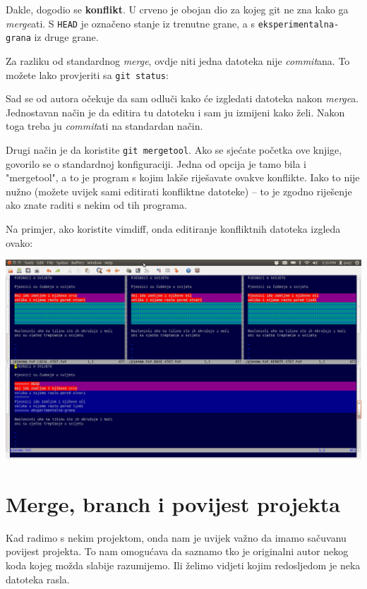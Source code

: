 Dakle, dogodio se \textbf{konflikt}. 
U crveno je obojan dio za kojeg git ne zna kako ga \emph{merge}ati.
S \verb+HEAD+ je označeno stanje iz trenutne grane, a s \verb+eksperimentalna-grana+ iz druge grane.

Za razliku od standardnog \emph{merge}, ovdje niti jedna datoteka nije \emph{commit}ana. 
To možete lako provjeriti sa \verb+git status+:



Sad se od autora očekuje da sam odluči kako će izgledati datoteka nakon \emph{merge}a.
Jednostavan način je da editira tu datoteku i sam ju izmijeni kako želi.
Nakon toga treba ju \emph{commit}ati na standardan način.

Drugi način je da koristite \verb+git mergetool+.
Ako se sjećate početka ove knjige, govorilo se o standardnoj konfiguraciji. 
Jedna od opcija je tamo bila i "mergetool", a to je program s kojim lakše riješavate ovakve konflikte.
Iako to nije nužno (možete uvijek sami editirati konfliktne datoteke) -- to je zgodno riješenje ako znate raditi s nekim od tih programa.

Na primjer, ako koristite vimdiff, onda editiranje konfliktnih datoteka izgleda ovako:

\includegraphics[width=14cm]{images/mergetool.png}

\section*{Merge, branch i povijest projekta}

Kad radimo s nekim projektom, onda nam je uvijek važno da imamo sačuvanu povijest projekta.
To nam omogućava da saznamo tko je originalni autor nekog koda kojeg možda slabije razumijemo.
Ili želimo vidjeti kojim redosljedom je neka datoteka rasla.

